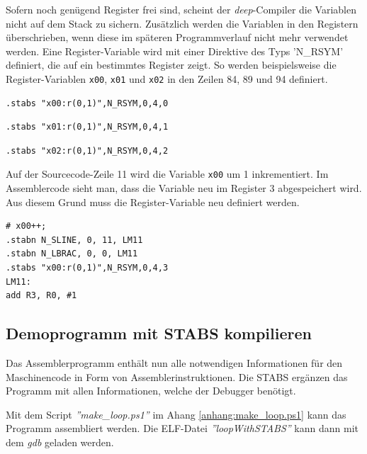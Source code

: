 Sofern noch genügend Register frei sind, scheint der \textit{deep}-Compiler die Variablen nicht auf dem Stack zu sichern.
Zusätzlich werden die Variablen in den Registern überschrieben, wenn diese im späteren Programmverlauf nicht mehr verwendet werden.
Eine Register-Variable wird mit einer Direktive des Typs 'N\_RSYM' definiert, die auf ein bestimmtes Register zeigt.
So werden beispielsweise die Register-Variablen \texttt{x00}, \texttt{x01} und \texttt{x02} in den Zeilen 84, 89 und 94 definiert.

\begin{lstlisting}
.stabs "x00:r(0,1)",N_RSYM,0,4,0
\end{lstlisting}

\begin{lstlisting}
.stabs "x01:r(0,1)",N_RSYM,0,4,1
\end{lstlisting}

\begin{lstlisting}
.stabs "x02:r(0,1)",N_RSYM,0,4,2
\end{lstlisting}
\lstset{firstnumber=1}


Auf der Sourcecode-Zeile 11 wird die Variable \texttt{x00} um 1 inkrementiert.
Im Assemblercode sieht man, dass die Variable neu im Register 3 abgespeichert wird.
Aus diesem Grund muss die Register-Variable neu definiert werden.

\begin{lstlisting}
# x00++;
.stabn N_SLINE, 0, 11, LM11
.stabn N_LBRAC, 0, 0, LM11
.stabs "x00:r(0,1)",N_RSYM,0,4,3
LM11:
add R3, R0, #1
\end{lstlisting}
\lstset{firstnumber=1}



\subsection{Demoprogramm mit STABS kompilieren}
Das Assemblerprogramm enthält nun alle notwendigen Informationen für den Maschinencode in Form von Assemblerinstruktionen.
Die STABS ergänzen das Programm mit allen Informationen, welche der Debugger benötigt.

Mit dem Script \textit{''make\_loop.ps1''} im Ahang \ref{anhang:make_loop.ps1} kann das Programm assembliert werden.
Die ELF-Datei \textit{''loopWithSTABS''} kann dann mit dem \textit{gdb} geladen werden.


